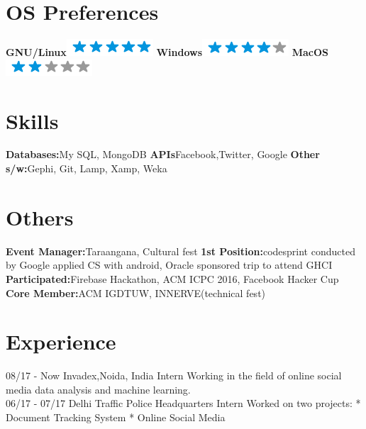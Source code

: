 \documentclass[]{friggeri-cv}
\begin{document}
\begin{aside}
  \section{OS Preferences}
    \textbf{GNU/Linux}\includegraphics[scale=0.40]{img/5stars.png}    \textbf{Windows}\includegraphics[scale=0.40]{img/4stars.png}
    \textbf{MacOS}\includegraphics[scale=0.40]{img/2stars.png}
     \section{Skills}
    \textbf{Databases:}{My SQL, MongoDB}
    \textbf{APIs}{Facebook,Twitter, Google}
    \textbf{Other s/w:}{Gephi, Git, Lamp, Xamp, Weka}
  \section{Others}
  \textbf{Event Manager:}{Taraangana, Cultural fest}
    \textbf{1st Position:}{codesprint conducted by Google applied CS with android, Oracle sponsored trip to attend GHCI}
    \textbf{Participated:}{Firebase Hackathon, ACM ICPC 2016, Facebook Hacker Cup }
    \textbf{Core Member:}{ACM IGDTUW, INNERVE(technical fest)}
\end{aside}

\section{Experience}
\begin{entrylist}
  \entry
    {08/17 - Now}
    {Invadex,Noida, India }
    {Intern}
    {Working in the field of online social media data analysis and machine learning. \\}
  \entry
    {06/17 - 07/17}
    {Delhi Traffic Police Headquarters}
    {Intern}
    {Worked on two projects:
* Document Tracking System                                           
* Online Social Media   \\}
   
\end{entrylist}
\end{document}
